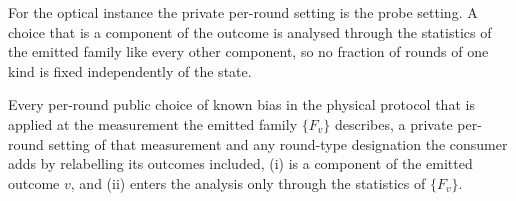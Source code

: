 
For the optical instance the private per-round setting is the probe
setting. A choice that is a component of the outcome is analysed through the
statistics of the emitted family like every other component, so no fraction
of rounds of one kind is fixed independently of the state.

\begin{assumption}\label{ass:tsm}
Every per-round public choice of known bias in the physical protocol that is
applied at the measurement the emitted family $\{F_v\}$ describes, a private
per-round setting of that measurement and any round-type designation the
consumer adds by relabelling its outcomes included,
(i) is a component of the emitted outcome $v$, and
(ii) enters the analysis only through the statistics of $\{F_v\}$.
\end{assumption}
